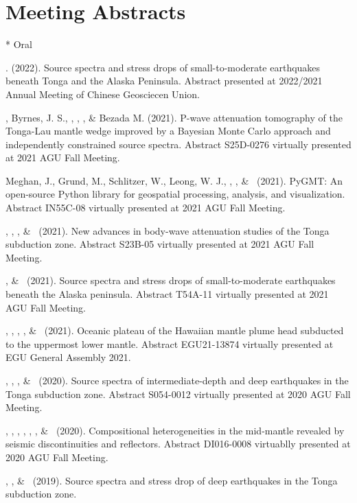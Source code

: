 \section{Meeting Abstracts}

* Oral

\begin{etaremune}
\item \Me*. (2022).
	Source spectra and stress drops of small-to-moderate earthquakes beneath Tonga and the Alaska Peninsula.
	Abstract presented at 2022/2021 Annual Meeting of Chinese Geosciecen Union.
\item \YZhang, Byrnes, J. S., \SWei, \Me, \FWang, \& Bezada M. (2021).
    P-wave attenuation tomography of the Tonga-Lau mantle wedge improved
    by a Bayesian Monte Carlo approach and independently constrained source spectra.
    Abstract S25D-0276 virtually presented at 2021 AGU Fall Meeting.
\item Meghan, J., Grund, M., Schlitzer, W., Leong, W. J., \Me, \JYao, \& \LUieda\ (2021).
    PyGMT: An open-source Python library for geospatial processing, analysis, and visualization.
    Abstract IN55C-08 virtually presented at 2021 AGU Fall Meeting.
\item \SWei, \YZhang, \Me, \& \DWiens\ (2021).
    New advances in body-wave attenuation studies of the Tonga subduction zone.
    Abstract S23B-05 virtually presented at 2021 AGU Fall Meeting.
\item \Me, \& \SWei\ (2021).
    Source spectra and stress drops of small-to-moderate earthquakes beneath the Alaska peninsula.
    Abstract T54A-11 virtually presented at 2021 AGU Fall Meeting.
\item \SWei, \PShearer, \CLithgowBertelloni, \LStixrude, \& \Me\ (2021).
    Oceanic plateau of the Hawaiian mantle plume head subducted to the uppermost lower mantle.
    Abstract EGU21-13874 virtually presented at EGU General Assembly 2021.
\item \Me, \WWang, \FWang, \& \SWei\ (2020).
    Source spectra of intermediate-depth and deep earthquakes in the Tonga subduction zone.
    Abstract S054-0012 virtually presented at 2020 AGU Fall Meeting.
\item \SWei, \Me, \PShearer, \MLv, \SDorfman, \CLithgowBertelloni, \& \LStixrude\ (2020).
    Compositional heterogeneities in the mid-mantle revealed by seismic discontinuities and reflectors.
    Abstract DI016-0008 virtuablly presented at 2020 AGU Fall Meeting.
\item \Me, \WWang, \& \SWei\ (2019).
    Source spectra and stress drop of deep earthquakes in the Tonga subduction zone.

\end{etaremune}

